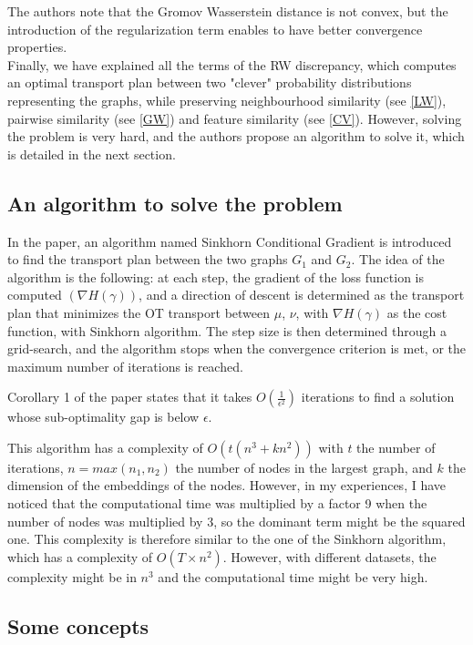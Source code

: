\documentclass[a4paper,11pt]{article}
\begin{document}
The authors note that the Gromov Wasserstein distance is not convex, but the introduction of the regularization term enables to have better convergence properties. \\[2cm]

Finally, we have explained all the terms of the RW discrepancy, which computes an optimal transport plan between two "clever" probability distributions representing the graphs, while preserving neighbourhood similarity (see \ref{LW}), pairwise similarity (see \ref{GW}) and feature similarity (see \ref{CV}).
However, solving the problem is very hard, and the authors propose an algorithm to solve it, which is detailed in the next section.


\subsection{An algorithm to solve the problem}

In the paper, an algorithm named Sinkhorn Conditional Gradient is introduced to find the transport plan between the two graphs $G_1$ and $G_2$. 
The idea of the algorithm is the following: at each step, the gradient of the loss function is computed $(\nabla H(\gamma))$, and a direction of descent is determined as the transport plan that minimizes the OT transport between $\mu$, $\nu$, with $\nabla H (\gamma)$ as the cost function, with Sinkhorn algorithm.
The step size is then determined through a grid-search, and the algorithm stops when the convergence criterion is met, or the maximum number of iterations is reached.

Corollary 1 of the paper states that it takes $O(\frac{1}{\epsilon^2})$ iterations to find a solution whose sub-optimality gap is below $\epsilon$. 

This algorithm has a complexity of $O(t(n^3 + kn^2 ))$ with $t$ the number of iterations, $n = max(n_1, n_2)$ the number of nodes in the largest graph, and $k$ the dimension of the embeddings of the nodes. 
However, in my experiences, I have noticed that the computational time was multiplied by a factor 9 when the number of nodes was multiplied by 3, so the dominant term might be the squared one. 
This complexity is therefore similar to the one of the Sinkhorn algorithm, which has a complexity of $O(T \times n^2)$. 
However, with different datasets, the complexity might be in $n^3$ and the computational time might be very high.

\subsection{Some concepts}
\end{document}
